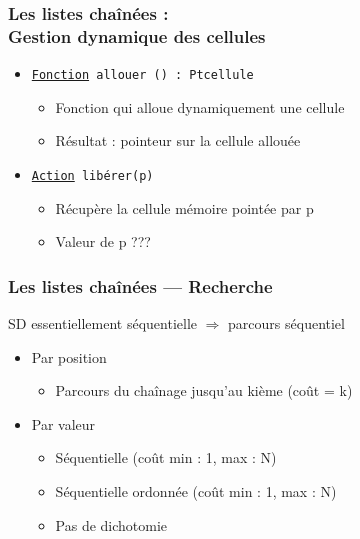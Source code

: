 \documentclass[table,handout,tikz,12pt,svgnames]{beamer}
\begin{document}
\begin{frame}[fragile=singleslide]
	\frametitle{Les listes chaînées :\\ Gestion dynamique des cellules}
	\begin{block}{} %
		\begin{itemize}
			\item \texttt{\underline{Fonction} allouer () : Ptcellule}
			\begin{itemize}
				\item Fonction qui alloue dynamiquement une cellule 
				\item Résultat : pointeur sur la cellule allouée
			\end{itemize}
			\item \texttt{\underline{Action} libérer(p)}
			\begin{itemize}
				\item Récupère la cellule mémoire pointée par p
				\item Valeur de p ???
			\end{itemize}
		\end{itemize}
	\end{block}
\end{frame}


\begin{frame}[fragile=singleslide]
	\frametitle{Les listes chaînées --- Recherche}
	\begin{block}{SD essentiellement séquentielle $\Rightarrow$ parcours séquentiel} %
		\begin{itemize}
			\item Par position
			\begin{itemize}
				\item Parcours du chaînage jusqu'au kième (coût = k)
			\end{itemize}
			\item Par valeur
			\begin{itemize}
				\item Séquentielle (coût min : 1, max : N)
				\item Séquentielle ordonnée (coût min : 1, max : N)
				\item Pas de dichotomie
			\end{itemize}
		\end{itemize}
	\end{block}
\end{frame}
\end{document}
